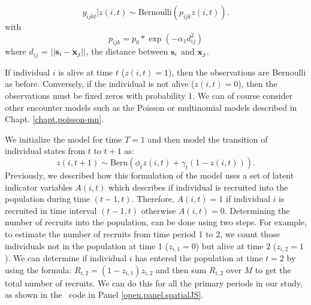 \[
  y_{ijkt}|z(i,t) \sim
\mbox{Bernoulli}(p_{ijk} z(i,t)).
\]
with
\begin{equation}
p_{ijk} = p_{0}*\exp(-\alpha_{1} d_{ij}^2)
\label{scr0.eq.norm}
\end{equation}
where $d_{ij}$ = $||{\bf s}_{i}-{\bf x}_{j}||$, the distance between
${\bf s}_{i}$ and ${\bf x}_{j}$.

If individual $i$ is alive at time $t$ ($z(i,t)=1$), then the
observations are Bernoulli as before.  Conversely, if the individual is
not alive ($z(i,t)=0$), then the observations must be fixed zeros with
probability 1.  We can of course consider other encounter models such as the
Poisson or multinomial models described 
in Chapt. \ref{chapt.poisson-mn}.

We initialize the
model for time $T=1$
and then model the transition of individual states from
$t$ to $t+1$ as: 
\[
 z(i,t+1) \sim \mbox{Bern}( \phi_t z(i,t)  + \gamma_t (1-z(i,t)) ).
\]
Previously, we described how this formulation of the model uses a set of latent indicator
variables $A(i,t)$ which describes if individual is recruited into the population during time
$(t-1, t)$.  Therefore, $A(i,t) = 1$
if individual $i$ is recruited in time interval $(t-1, t)$ otherwise
$A(i,t)=0$. 
Determining the number of recruits into the population,
can be done using two steps.
For example, to estimate the number of recruits from time period 1 to 2, we count those
individuals not in the population at time 1 ($z_{i,1} = 0$) but alive at time 2 ($z_{i,2} = 1$).
We can determine if individual $i$ has entered the population at time $t=2$ by using the formula:
 $R_{i,2}=(1-z_{i,1})z_{i,2}$ and then sum
$R_{i,2}$ over $M$ to get the total number of recruits.
We can do this for all the primary periods in our study,
as shown
in the \jags~code in Panel \ref{open.panel.spatialJS}.



